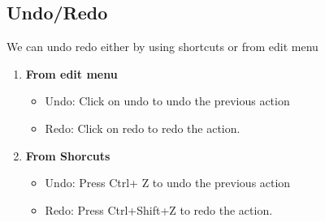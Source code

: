 \subsection{Undo/Redo}
We can undo redo either by using shortcuts or from edit menu
\begin{enumerate}
\item \textbf{From edit menu}
\begin{itemize}
\item Undo: Click on undo to undo the previous action
\item Redo: Click on redo to redo the action.
\end{itemize}
\item \textbf{From Shorcuts}
\begin{itemize}
\item Undo: Press Ctrl+ Z to undo the previous action
\item Redo: Press Ctrl+Shift+Z to redo the action.
\end{itemize}
\end{enumerate}